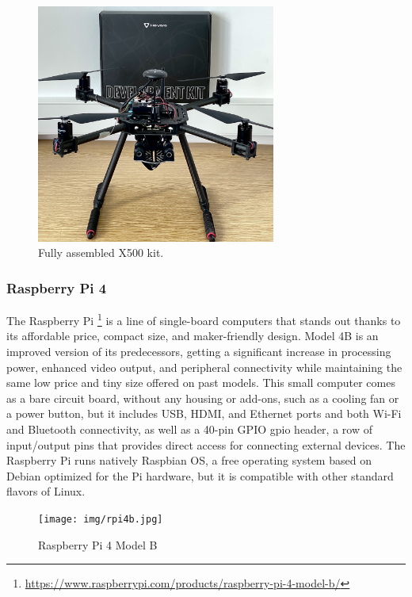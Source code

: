 \begin{figure}
  \centering
  \includegraphics[width=0.7\textwidth,keepaspectratio]{img/X500-assembled.jpg}
  \caption{Fully assembled X500 kit.}
  \label{fig:x500}
\end{figure}

\subsubsection{Raspberry Pi 4}
\label{subsec:rpi}
The Raspberry Pi \footnote{\url{https://www.raspberrypi.com/products/raspberry-pi-4-model-b/}} is a line of single-board computers that stands out thanks to its affordable price,
compact size, and maker-friendly design. Model 4B is an improved version of its predecessors,
getting a significant increase in processing power, enhanced video output, and peripheral connectivity
while maintaining the same low price and tiny size offered on past models.
This small computer comes as a bare circuit board,
without any housing or add-ons, such as a cooling fan or a power button,
but it includes USB, HDMI, and Ethernet ports and both Wi-Fi and Bluetooth connectivity,
as well as a 40-pin GPIO \gls{gpio} header, a row of input/output pins that provides direct access for connecting external devices.
The Raspberry Pi runs natively Raspbian OS, a free operating system based on Debian optimized for the Pi hardware, but it is compatible with other standard flavors of Linux.

\begin{figure}
  \centering
  \texttt{[image: img/rpi4b.jpg]}
  \caption{Raspberry Pi 4 Model B}
  \label{fig:rpi4b}
\end{figure}
